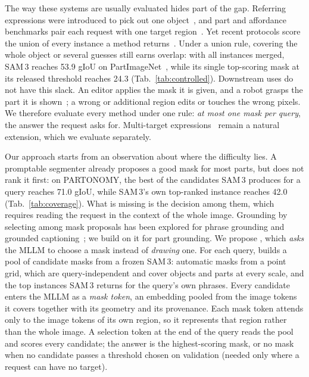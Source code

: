 The way these systems are usually evaluated hides part of the gap. Referring expressions were introduced to pick
out one object~\cite{refcoco,refcocog_mao}, and part and affordance benchmarks pair each request with one target
region~\cite{paco,partimagenet,instructpart}. Yet recent protocols score the union of every instance a method
returns~\cite{ophrg,gres}. Under a union rule, covering the whole object or several guesses still earns overlap:
with all instances merged, SAM\,3 reaches 53.9 gIoU on PartImageNet~\cite{ophrg}, while its single top-scoring
mask at its released threshold reaches 24.3 (Tab.~\ref{tab:controlled}). Downstream uses do not have this slack.
An editor applies the mask it is given, and a robot grasps the part it is shown~\cite{affordjev,partgrounding_bottleneck}; a wrong or additional region edits or touches the
wrong pixels. We therefore evaluate every method under one rule: \emph{at most one mask per query}, the answer the
request asks for. Multi-target expressions~\cite{gres,gsva} remain a natural extension, which we evaluate
separately.

Our approach starts from an observation about where the difficulty lies. A promptable segmenter already proposes
a good mask for most parts, but does not rank it first: on PARTONOMY, the best of the candidates SAM\,3 produces for
a query reaches 71.0 gIoU, while SAM\,3's own top-ranked instance reaches 42.0 (Tab.~\ref{tab:coverage}). What is missing is the decision among them, which requires reading the request in the context of the whole image.
Grounding by selecting among mask proposals has been explored for phrase grounding and grounded
captioning~\cite{groundhog,panorama}; we build on it for part grounding. We propose \ours{}, which \emph{asks} the
MLLM to choose a mask instead of \emph{drawing} one. For each query, \ours{} builds a pool of candidate masks from a frozen SAM\,3: automatic masks from a point
grid, which are query-independent and cover objects and parts at every scale, and the top instances SAM\,3 returns
for the query's own phrases. Every candidate enters the MLLM as a \emph{mask token}, an embedding pooled from the
image tokens it covers together with its geometry and its provenance. Each mask token attends only to the image
tokens of its own region, so it represents that region rather than the whole image. A selection token at the end
of the query reads the pool and scores every candidate; the answer is the highest-scoring mask, or no mask when no
candidate passes a threshold chosen on validation (needed only where a request can have no target).

